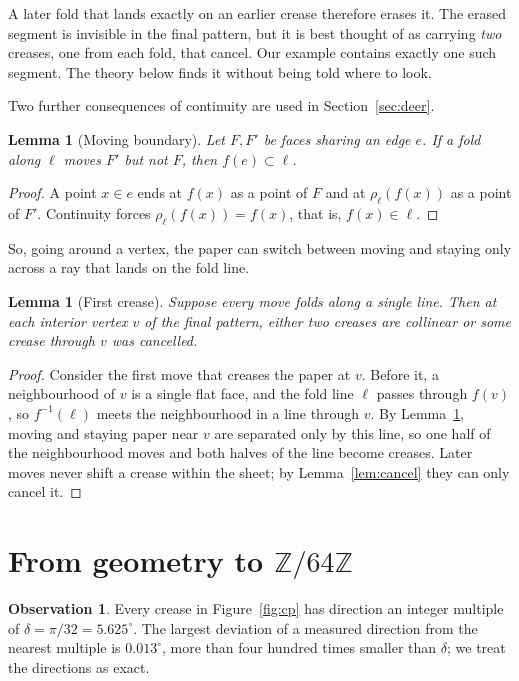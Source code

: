 \documentclass[11pt]{article}
\newtheorem{lemma}[theorem]{Lemma}
\theoremstyle{definition}
\newtheorem{observation}[theorem]{Observation}
\theoremstyle{remark}
\newcommand{\Z}{\mathbb{Z}}
\newcommand{\ZN}{\Z/64\Z}
\begin{document}
A later fold that lands exactly on an earlier crease therefore erases it. The erased segment is invisible in the final pattern, but it is best thought of as carrying \emph{two} creases, one from each fold, that cancel. Our example contains exactly one such segment. The theory below finds it without being told where to look.

Two further consequences of continuity are used in Section~\ref{sec:deer}.

\begin{lemma}[Moving boundary]\label{lem:boundary}
Let $F,F'$ be faces sharing an edge $e$. If a fold along $\ell$ moves $F'$ but not $F$, then $f(e)\subset\ell$.
\end{lemma}
\begin{proof}
A point $x\in e$ ends at $f(x)$ as a point of $F$ and at $\rho_\ell(f(x))$ as a point of $F'$. Continuity forces $\rho_\ell(f(x))=f(x)$, that is, $f(x)\in\ell$.
\end{proof}

So, going around a vertex, the paper can switch between moving and staying only across a ray that lands on the fold line.

\begin{lemma}[First crease]\label{lem:first}
Suppose every move folds along a single line. Then at each interior vertex $v$ of the final pattern, either two creases are collinear or some crease through $v$ was cancelled.
\end{lemma}
\begin{proof}
Consider the first move that creases the paper at $v$. Before it, a neighbourhood of $v$ is a single flat face, and the fold line $\ell$ passes through $f(v)$, so $f^{-1}(\ell)$ meets the neighbourhood in a line through $v$. By Lemma~\ref{lem:boundary}, moving and staying paper near $v$ are separated only by this line, so one half of the neighbourhood moves and both halves of the line become creases. Later moves never shift a crease within the sheet; by Lemma~\ref{lem:cancel} they can only cancel it.
\end{proof}

\section{From geometry to \texorpdfstring{$\ZN$}{Z/64Z}}\label{sec:discrete}

\begin{observation}\label{obs:discrete}
Every crease in Figure~\ref{fig:cp} has direction an integer multiple of $\delta=\pi/32=5.625^\circ$. The largest deviation of a measured direction from the nearest multiple is $0.013^\circ$, more than four hundred times smaller than $\delta$; we treat the directions as exact.
\end{observation}
\end{document}
